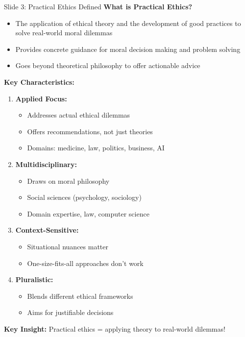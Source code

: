 \documentclass[8pt]{beamer}
\begin{document}
	\begin{frame}{Slide 3: Practical Ethics Defined}
		\fontsize{6.5}{7.5}\selectfont
		\textbf{What is Practical Ethics?}
		\begin{itemize}
			\item The application of ethical theory and the development of good practices to solve real-world moral dilemmas
			\item Provides concrete guidance for moral decision making and problem solving
			\item Goes beyond theoretical philosophy to offer actionable advice
		\end{itemize}
		
		\vspace{0.1cm}
		\textbf{Key Characteristics:}
		\begin{enumerate}
			\item \textbf{Applied Focus:}
			\begin{itemize}
				\item Addresses actual ethical dilemmas
				\item Offers recommendations, not just theories
				\item Domains: medicine, law, politics, business, AI
			\end{itemize}
			\item \textbf{Multidisciplinary:}
			\begin{itemize}
				\item Draws on moral philosophy
				\item Social sciences (psychology, sociology)
				\item Domain expertise, law, computer science
			\end{itemize}
			\item \textbf{Context-Sensitive:}
			\begin{itemize}
				\item Situational nuances matter
				\item One-size-fits-all approaches don't work
			\end{itemize}
			\item \textbf{Pluralistic:}
			\begin{itemize}
				\item Blends different ethical frameworks
				\item Aims for justifiable decisions
			\end{itemize}
		\end{enumerate}
		
		\textcolor{myblue}{\textbf{Key Insight:}} Practical ethics = \textcolor{myblue}{applying theory to real-world dilemmas}!
	\end{frame}
	
\end{document}
